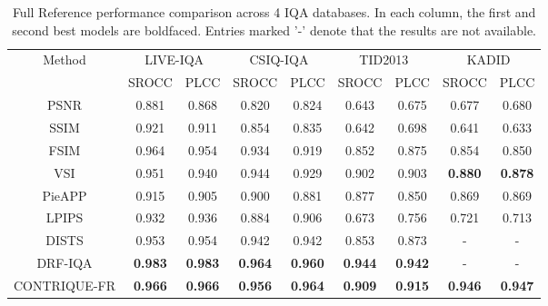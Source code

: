 \documentclass[journal]{IEEEtran}
\begin{document}
\begin{table*}[t]
\centering
\caption{Full Reference performance comparison across 4 IQA databases. In each column, the first and second best models are boldfaced. Entries marked '-' denote that the results are not available.}
    \label{table:FR_methods_comparison}
    \begin{tabular}{|c||c|c|c|c|c|c|c|c|}
        \hline
        \multirow{2}{*}{Method}& \multicolumn{2}{|c|}{LIVE-IQA\cite{sheikh2006statistical}} & \multicolumn{2}{|c|}{CSIQ-IQA \cite{larson2010most}} & \multicolumn{2}{|c|}{TID2013 \cite{ponomarenko2015image}} & \multicolumn{2}{|c|}{KADID \cite{lin2019kadid}} \\
        \cline{2-9}
        ~ & SROCC & PLCC & SROCC & PLCC & SROCC & PLCC & SROCC & PLCC \\ \hline \hline
        PSNR & 0.881 & 0.868 & 0.820 & 0.824 & 0.643 & 0.675 & 0.677 & 0.680 \\ 
        SSIM \cite{wang2004image} & 0.921 & 0.911 & 0.854 & 0.835 & 0.642 & 0.698 & 0.641 & 0.633 \\  
        FSIM \cite{zhang2011fsim} & 0.964 & 0.954 & 0.934 & 0.919 & 0.852 & 0.875 & 0.854 & 0.850 \\
        VSI \cite{zhang2014vsi} & 0.951 & 0.940 & 0.944 & 0.929 & 0.902 & 0.903 & \textbf{0.880} & \textbf{0.878} \\ \hline
PieAPP \cite{prashnani2018pieapp} & 0.915 & 0.905 & 0.900 & 0.881 & 0.877 & 0.850 & 0.869 & 0.869 \\ 
        LPIPS \cite{zhang2018unreasonable} & 0.932 & 0.936 & 0.884 & 0.906 & 0.673 & 0.756 & 0.721 & 0.713 \\
        DISTS \cite{ding2020image} & 0.953 & 0.954 & 0.942 & 0.942 & 0.853 & 0.873 & - & - \\ 
        DRF-IQA \cite{kim2020dynamic} & \textbf{0.983} & \textbf{0.983} & \textbf{0.964} & \textbf{0.960} & \textbf{0.944} & \textbf{0.942} & - & - \\ \hline
        CONTRIQUE-FR & \textbf{0.966} & \textbf{0.966} & \textbf{0.956} & \textbf{0.964} & \textbf{0.909} & \textbf{0.915} & \textbf{0.946} & \textbf{0.947} \\  
        \hline
    \end{tabular}
\end{table*}
\end{document}
